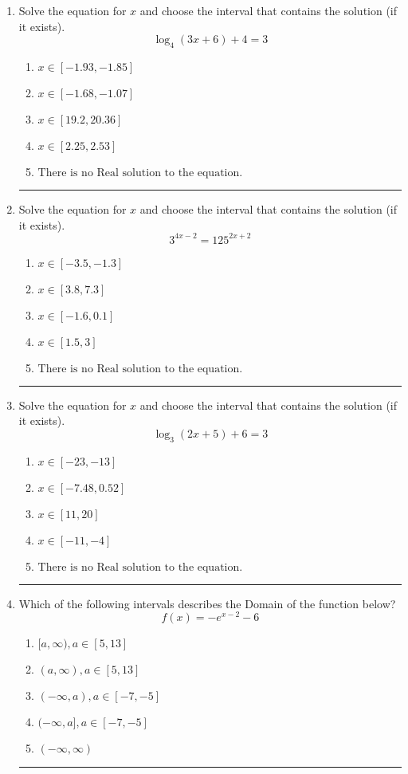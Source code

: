 \documentclass[14pt]{extbook}
\newcommand{\litem}[1]{\item#1\hspace*{-1cm}\rule{\textwidth}{0.4pt}}
\begin{document}
\begin{enumerate}
{\begin{enumerate}[label=\Alph*.]
\end{enumerate} }
\litem{
Solve the equation for $x$ and choose the interval that contains the solution (if it exists).\[ \log_{4}{(3x+6)}+4 = 3 \]\begin{enumerate}[label=\Alph*.]
\item \( x \in [-1.93, -1.85] \)
\item \( x \in [-1.68, -1.07] \)
\item \( x \in [19.2, 20.36] \)
\item \( x \in [2.25, 2.53] \)
\item \( \text{There is no Real solution to the equation.} \)

\end{enumerate} }
\litem{
Solve the equation for $x$ and choose the interval that contains the solution (if it exists).\[ 3^{4x-2} = 125^{2x+2} \]\begin{enumerate}[label=\Alph*.]
\item \( x \in [-3.5, -1.3] \)
\item \( x \in [3.8, 7.3] \)
\item \( x \in [-1.6, 0.1] \)
\item \( x \in [1.5, 3] \)
\item \( \text{There is no Real solution to the equation.} \)

\end{enumerate} }
\litem{
Solve the equation for $x$ and choose the interval that contains the solution (if it exists).\[ \log_{3}{(2x+5)}+6 = 3 \]\begin{enumerate}[label=\Alph*.]
\item \( x \in [-23, -13] \)
\item \( x \in [-7.48, 0.52] \)
\item \( x \in [11, 20] \)
\item \( x \in [-11, -4] \)
\item \( \text{There is no Real solution to the equation.} \)

\end{enumerate} }
\litem{
Which of the following intervals describes the Domain of the function below?\[ f(x) = -e^{x-2}-6 \]\begin{enumerate}[label=\Alph*.]
\item \( [a, \infty), a \in [5, 13] \)
\item \( (a, \infty), a \in [5, 13] \)
\item \( (-\infty, a), a \in [-7, -5] \)
\item \( (-\infty, a], a \in [-7, -5] \)
\item \( (-\infty, \infty) \)


\end{enumerate}}
\end{enumerate}
\end{document}
